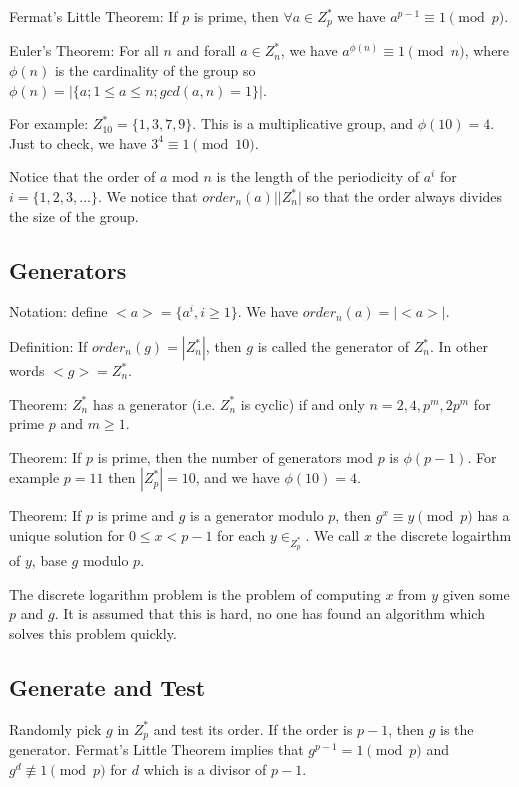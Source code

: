 \documentclass[psamsfonts]{amsart}
\begin{document}
Fermat's Little Theorem: If $p$ is prime, then $\forall a \in Z_{p}^*$ we have $a^{p-1} \equiv 1 \pmod{p}$.

Euler's Theorem: For all $n$ and forall $a \in Z_{n}^*$, we have $a^{\phi(n)} \equiv 1 \pmod{n}$, where $\phi(n)$ is the cardinality of the group so $\phi(n) = |\{a; 1 \leq a \leq n; gcd(a,n) = 1 \} |$. 

For example: $Z_{10}^* = \{1, 3, 7, 9\}$. This is a multiplicative group, and $\phi(10) = 4$. Just to check, we have $3^{4} \equiv 1 \pmod{10}$.

Notice that the order of $a$ mod $n$ is the length of the periodicity of $a^{i}$ for $i = \{1,2,3,\ldots\}$. We notice that $order_{n}(a) | |Z_{n}^*|$ so that the order always divides the size of the group.

\subsection{Generators}

Notation: define $<a> = \{a^i, i \geq 1 \}$. We have $order_{n}(a) = |<a>|$.

Definition: If $order_{n}(g) = |Z_{n}^*|$, then $g$ is called the generator of $Z_{n}^*$. In other words $<g> = Z_{n}^*$.

Theorem: $Z_{n}^*$ has a generator (i.e. $Z_{n}^*$ is cyclic) if and only $n = 2,4, p^m, 2p^m$ for prime $p$ and $m \geq 1$.

Theorem: If $p$ is prime, then the number of generators mod $p$ is $\phi(p-1)$. For example $p = 11$ then $|Z_{p}^*| = 10$, and we have $\phi(10) = 4$.

Theorem: If $p$ is prime and $g$ is a generator modulo $p$, then $g^{x} \equiv y \pmod{p}$ has a unique solution for $0 \leq x < p -1$ for each $y \in _Z_p^*$. We call $x$ the discrete logairthm of $y$, base $g$ modulo $p$.

The discrete logarithm problem is the problem of computing $x$ from $y$ given some $p$ and $g$. It is assumed that this is hard, no one has found an algorithm which solves this problem quickly.

\subsection{Generate and Test}

Randomly pick $g$ in $Z_{p}^*$ and test its order. If the order is $p-1$, then $g$ is the generator. Fermat's Little Theorem implies that $g^{p-1} = 1 \pmod{p}$ and $g^{d} \not \equiv 1 \pmod{p}$ for $d$ which is a divisor of $p-1$.
\end{document}
